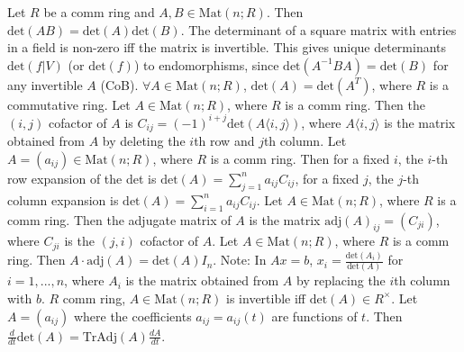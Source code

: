 Let $R$ be a comm ring and $A, B \in \text{Mat}(n; R)$.
Then $\text{det}(AB) = \text{det}(A) \text{det}(B)$.
The determinant of a square matrix with entries in a field is non-zero iff the matrix is invertible.
This gives unique determinants $\text{det}(f|V)$ (or $\text{det}(f)$) to endomorphisms, since $\text{det}(A^{-1}BA) = \text{det}(B)$
for any invertible $A$ (CoB).
 $\forall A \in \text{Mat}(n; R)$, $\text{det}(A) = \text{det}(A^T)$, where $R$ is a commutative ring.
Let $A \in \text{Mat}(n; R)$, where $R$ is a comm ring.
Then the $(i, j)$ cofactor of $A$ is $C_{ij} = (-1)^{i+j} \text{det}(A \langle i, j \rangle)$,
where $A \langle i, j \rangle$ is the matrix obtained from $A$ by deleting the $i$th row and $j$th column.
Let $A = (a_{ij}) \in \text{Mat}(n; R)$, where $R$ is a comm ring.
Then for a fixed $i$, the $i$-th row expansion of the det is
$\text{det}(A) = \sum_{j = 1}^n a_{ij} C_{ij}$,
for a fixed $j$, the $j$-th column expansion is
$\text{det}(A) = \sum_{i = 1}^n a_{ij} C_{ij}$.
Let $A \in \text{Mat}(n; R)$, where $R$ is a comm ring.
Then the adjugate matrix of $A$ is the matrix $\text{adj}(A)_{ij} = (C_{ji})$,
where $C_{ji}$ is the $(j, i)$ cofactor of $A$.
Let $A \in \text{Mat}(n; R)$, where $R$ is a comm ring.
Then $A \cdot \text{adj}(A) = \text{det}(A) I_n$.
Note: In $Ax = b$, $x_i = \frac{\text{det}(A_i)}{\text{det}(A)}$ for $i = 1, ..., n$,
where $A_i$ is the matrix obtained from $A$ by replacing the $i$th column with $b$.
$R$ comm ring, $A \in \text{Mat}(n; R)$ is invertible iff $\text{det}(A) \in R^\times$.
Let $A = (a_{ij})$ where the coefficients $a_{ij} = a_{ij}(t)$ are functions of $t$.
Then $\frac{d}{dt} \text{det}(A) = \text{Tr} \text{Adj}(A) \frac{d A}{dt}$.
